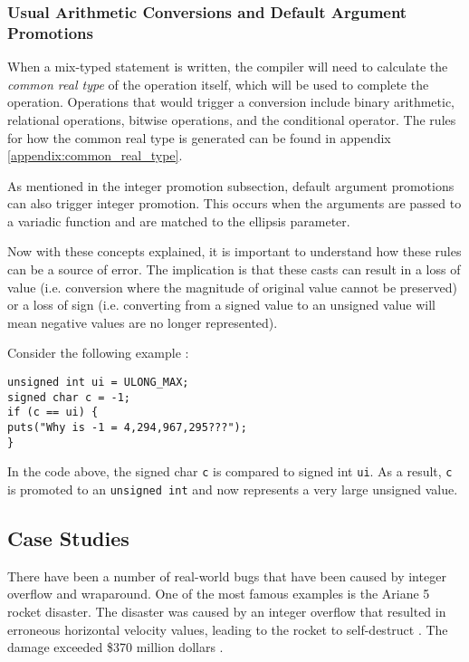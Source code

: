 \subsubsection{Usual Arithmetic Conversions and Default Argument Promotions}

When a mix-typed statement is written, the compiler will need to calculate the \textit{common real type} of the operation itself, which will be used to complete the operation. Operations that would trigger a conversion include binary arithmetic, relational operations, bitwise operations, and the conditional operator. The rules for how the common real type is generated can be found in appendix \ref{appendix:common_real_type}.


As mentioned in the integer promotion subsection, default argument promotions can also trigger integer promotion. This occurs when the arguments are passed to a variadic function and are matched to the ellipsis parameter.

Now with these concepts explained, it is important to understand how these rules can be a source of error. The implication is that these casts can result in a loss of value (i.e. conversion where the magnitude of original value cannot be preserved) or a loss of sign (i.e. converting from a signed value to an unsigned value will mean negative values are no longer represented).

Consider the following example \cite{secure_coding} :

\begin{center}
\parbox{0.9\linewidth}{
\texttt{unsigned int ui = ULONG\_MAX;\\
signed char c = -1;\\
if (c == ui) \{\\
\hspace*{2em}puts("Why is -1 = 4,294,967,295???");\\
\}
}}
\end{center}

In the code above, the signed char \texttt{c} is compared to signed int \texttt{ui}. As a result, \texttt{c} is promoted to an \texttt{unsigned int} and now represents a very large unsigned value.

\subsection{Case Studies}

There have been a number of real-world bugs that have been caused by integer overflow and wraparound. One of the most famous examples is the Ariane 5 rocket disaster. The disaster was caused by an integer overflow that resulted in erroneous horizontal velocity values, leading to the rocket to self-destruct \cite{a5}. The damage exceeded \$370 million dollars \cite{a5_cost}.

